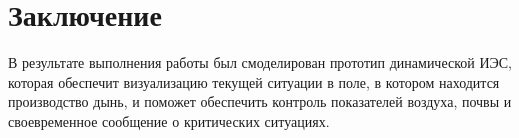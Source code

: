 \chapter*{Заключение}

В результате выполнения работы был смоделирован прототип динамической ИЭС, которая обеспечит визуализацию текущей ситуации в поле, в котором находится производство дынь, и поможет обеспечить контроль показателей воздуха, почвы и своевременное сообщение о критических ситуациях.


